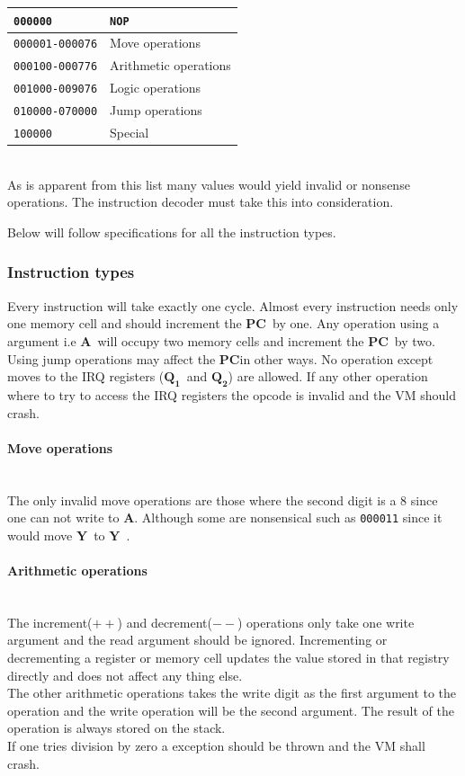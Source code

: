 \documentclass{article}
\newcommand{\V}{\verb}
\newcommand{\y}{$\textbf{Y}$}
\newcommand{\A}{$\textbf{A}$}
\newcommand{\q}{$\textbf{Q}_{\textbf{1}}$}
\newcommand{\qq}{$\textbf{Q}_{\textbf{2}}$}
\newcommand{\pc}{$\textbf{PC}$}
\begin{document}
\begin{tabular}{l l}
  \V+000000+ & \V+NOP+ \\
  \hline
  \V+000001-000076+ & Move operations \\
  \hline
  \V+000100-000776+ & Arithmetic operations \\
  \hline
  \V+001000-009076+ & Logic operations \\
  \hline
  \V+010000-070000+ & Jump operations \\
  \hline
  \V+100000+ & Special \\
\end{tabular} \\
As is apparent from this list many values would yield invalid or
nonsense operations.
The instruction decoder must take this into consideration.

Below will follow specifications for all the instruction types.

\subsubsection{Instruction types}
Every instruction will take exactly one cycle. Almost every instruction needs
only one memory cell and should increment the \pc \  by one.
Any operation using  a argument i.e \A \ will occupy two memory cells and
increment the \pc \ by two.\\
Using jump operations may affect the \pc in other ways.
No operation except moves to the IRQ registers (\q \ and \qq ) are allowed.
If any other operation where to try to access the IRQ registers the opcode is
invalid and the VM should crash.

\paragraph{Move operations}\
\\
The only invalid move operations are those where the second digit is a 8 since
one can not write to \A.
Although some are nonsensical such as \V+000011+ since it would move \y \ to \y \ .

\paragraph{Arithmetic operations} \
\\
The increment($++$) and decrement($--$) operations only take one write argument
and the read argument should be ignored. Incrementing or decrementing a register
or memory cell updates the value stored in that registry directly and does not
affect any thing else.\\
The other arithmetic operations takes the write digit as the first argument to
the operation and the write operation will be the second argument.
The result of the operation is always stored on the stack.\\
If one tries division by zero a exception should be thrown and the VM shall
crash.
\end{document}
